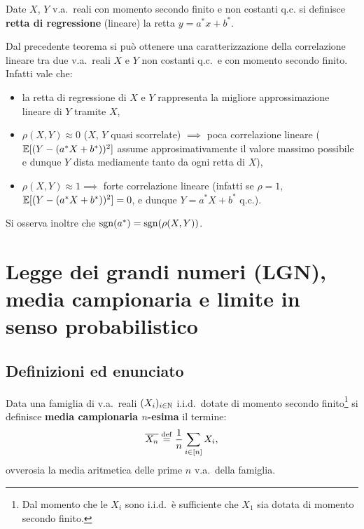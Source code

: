 \begin{multicols*}{2}
\begin{definition}
    Date $X$, $Y$ v.a.~reali con momento secondo finito e non costanti q.c.
    si definisce \textbf{retta di regressione} (lineare) la retta $y = a^*x + b^*$.
\end{definition}

\begin{remark}
    Dal precedente teorema si può ottenere una caratterizzazione della
    correlazione lineare tra due v.a.~reali $X$ e $Y$ non costanti q.c.~e con
    momento secondo finito. Infatti vale che:
    \begin{itemize}
        \item la retta di regressione di $X$ e $Y$ rappresenta la migliore approssimazione
        lineare di $Y$ tramite $X$,
        
        \item $\rho(X, Y) \approx 0$ ($X$, $Y$ quasi scorrelate) $\implies$ poca correlazione lineare ($\mathbb{E}[(Y - (a^* X + b^*))^2]$ assume approsimativamente il valore massimo possibile e dunque $Y$
        dista mediamente tanto da ogni retta di $X$),
        \item $\rho(X, Y) \approx 1 \implies$ forte correlazione lineare (infatti se
        $\rho = 1$, $\mathbb{E}[(Y - (a^* X + b^*))^2] = 0$, e dunque $Y = a^* X + b^*$ q.c.).
    \end{itemize}
    Si osserva inoltre che $\operatorname{sgn}(a^*) = \operatorname{sgn}(\rho(X, Y))$.
\end{remark}

\section{Legge dei grandi numeri (LGN), media campionaria e limite in senso probabilistico}

\subsection{Definizioni ed enunciato}

\begin{definition}
    Data una famiglia di v.a.~reali $(X_i)_{i \in \mathbb{N}}$ i.i.d.~dotate di momento secondo
    finito\footnote{
        Dal momento che le $X_i$ sono i.i.d.~è sufficiente che $X_1$ sia dotata di
        momento secondo finito.
    } si definisce \textbf{media campionaria $n$-esima} il termine:
    \[
        \overline{X_n} \overset{\mathrm{def}}{=} \frac{1}{n} \sum_{i \in [n]} X_i, 
    \]
    ovverosia la media aritmetica delle prime $n$ v.a.~della famiglia.
\end{definition}


\end{multicols*}
